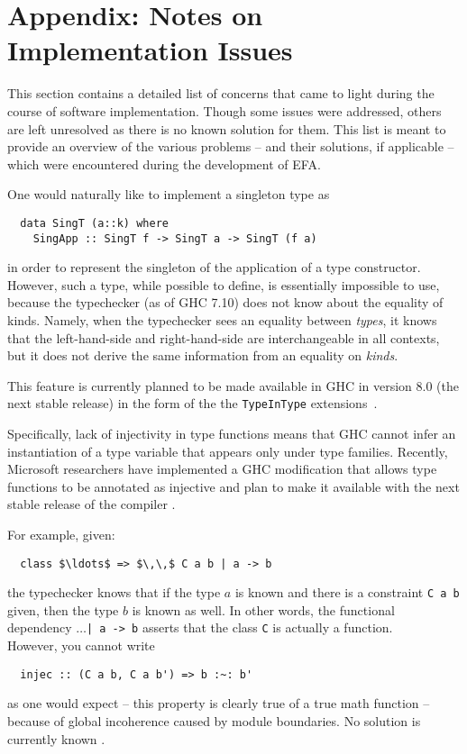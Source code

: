 \chapter*{Appendix: Notes on Implementation Issues}

This section contains a detailed list of concerns that came to light during the
course of software implementation. Though some issues were addressed, others are
left unresolved as there is no known solution for them. This list is meant to
provide an overview of the various problems -- and their solutions, if
applicable -- which were encountered during the development of EFA. 

\begin{description}[leftmargin=1em]
\item[No kind equality] 
  One would naturally like to implement a singleton type as
  \begin{lstlisting}
  data SingT (a::k) where
    SingApp :: SingT f -> SingT a -> SingT (f a) 
  \end{lstlisting}
  in order to represent the singleton of the application of a type
  constructor.  However, such a type, while possible to define, is essentially
  impossible to use, because the typechecker (as of GHC 7.10) does not know
  about the equality of kinds. Namely, when the typechecker sees an equality
  between \emph{types}, it knows that the left-hand-side and right-hand-side
  are interchangeable in all contexts, but it does not derive the same
  information from an equality on \emph{kinds}.
  
  This feature is currently planned to be made available in GHC in version 8.0
  (the next stable release) in the form of the the \texttt{TypeInType}
  extensions~\cite{typeintype}.

\item[Non-injective type families] 
  Specifically, lack of injectivity in type functions means that GHC cannot infer
  an instantiation of a type variable that appears only under type
  families. Recently, Microsoft researchers have implemented a GHC modification
  that allows type functions to be annotated as injective and plan to make it
  available with the next stable release of the compiler \cite{microsoft}.

\item[Functional dependencies are \emph{not} equivalent to type families] 
  For example, given:
  \begin{lstlisting}
  class $\ldots$ => $\,\,$ C a b | a -> b
  \end{lstlisting}
  the typechecker knows that if the type $a$ is known and there is a constraint
  \lstinline{C a b} given, then the type $b$ is known as well. In other words, the functional 
  dependency $\ldots$\lstinline{| a -> b} asserts that the class \lstinline{C} is
  actually a function. \\ 
  However, you cannot write
  \begin{lstlisting}
  injec :: (C a b, C a b') => b :~: b' 
  \end{lstlisting}
  as one would expect -- this property is clearly true of a true math function --
  because of global incoherence caused by module boundaries. No solution 
  is currently known \cite{sof}.


\end{description}
